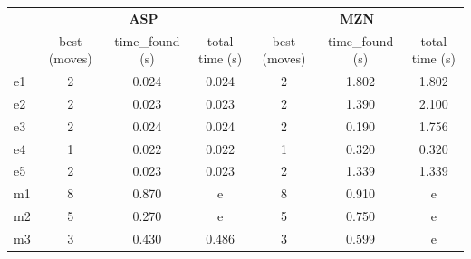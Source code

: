 \documentclass[headinclude, footinclude, abstract=on]{scrarticle}
\begin{document}
\begin{table}[H] 
\begin{tabular}{l|ccc|ccc|}
\cline{2-7}
                          & \multicolumn{3}{c|}{\textbf{ASP}}                                                         & \multicolumn{3}{c|}{\textbf{MZN}}                                                         \\ \cline{2-7} 
                          & \multicolumn{1}{c|}{best (moves)} & \multicolumn{1}{c|}{time\_found (s)} & total time (s) & \multicolumn{1}{c|}{best (moves)} & \multicolumn{1}{c|}{time\_found (s)} & total time (s) \\ \hline
\multicolumn{1}{|l|}{e1}  & \multicolumn{1}{c|}{2}            & \multicolumn{1}{c|}{0.024}           & 0.024          & \multicolumn{1}{c|}{2}            & \multicolumn{1}{c|}{1.802}           & 1.802          \\ \hline
\multicolumn{1}{|l|}{e2}  & \multicolumn{1}{c|}{2}            & \multicolumn{1}{c|}{0.023}           & 0.023          & \multicolumn{1}{c|}{2}            & \multicolumn{1}{c|}{1.390}           & 2.100          \\ \hline
\multicolumn{1}{|l|}{e3}  & \multicolumn{1}{c|}{2}            & \multicolumn{1}{c|}{0.024}           & 0.024          & \multicolumn{1}{c|}{2}            & \multicolumn{1}{c|}{0.190}           & 1.756          \\ \hline
\multicolumn{1}{|l|}{e4}  & \multicolumn{1}{c|}{1}            & \multicolumn{1}{c|}{0.022}           & 0.022          & \multicolumn{1}{c|}{1}            & \multicolumn{1}{c|}{0.320}           & 0.320          \\ \hline
\multicolumn{1}{|l|}{e5}  & \multicolumn{1}{c|}{2}            & \multicolumn{1}{c|}{0.023}           & 0.023          & \multicolumn{1}{c|}{2}            & \multicolumn{1}{c|}{1.339}           & 1.339          \\ \hline
\multicolumn{1}{|l|}{m1}  & \multicolumn{1}{c|}{8}            & \multicolumn{1}{c|}{0.870}           & e              & \multicolumn{1}{c|}{8}            & \multicolumn{1}{c|}{0.910}           & e              \\ \hline
\multicolumn{1}{|l|}{m2}  & \multicolumn{1}{c|}{5}            & \multicolumn{1}{c|}{0.270}           & e              & \multicolumn{1}{c|}{5}            & \multicolumn{1}{c|}{0.750}           & e              \\ \hline
\multicolumn{1}{|l|}{m3}  & \multicolumn{1}{c|}{3}            & \multicolumn{1}{c|}{0.430}           & 0.486          & \multicolumn{1}{c|}{3}            & \multicolumn{1}{c|}{0.599}           & e              \\ \hline

\end{tabular}
\end{table}
\end{document}
